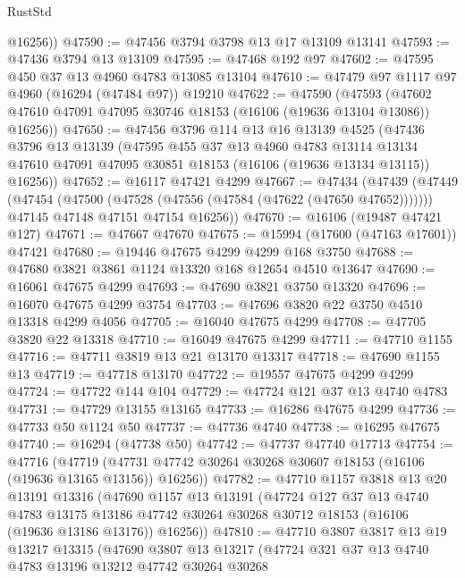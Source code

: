\begin{lexlean}{RustStd}
\begin{coremodule}
        @16256))
@47590 := @47456 @3794 @3798 @13 @17 @13109 @13141
@47593 := @47436 @3794 @13 @13109
@47595 := @47468 @192 @97
@47602 := @47595 @450 @37 @13 @4960 @4783 @13085 @13104
@47610 := @47479 @97 @1117 @97 @4960 (@16294 (@47484 @97)) @19210
@47622 := @47590
    (@47593 (@47602 @47610 @47091 @47095 @30746 @18153 (@16106 (@19636 @13104 @13086)) @16256))
@47650 := @47456
    @3796
    @114
    @13
    @16
    @13139
    @4525
    (@47436
      @3796
      @13
      @13139
      (@47595
        @455
        @37
        @13
        @4960
        @4783
        @13114
        @13134
        @47610
        @47091
        @47095
        @30851
        @18153
        (@16106 (@19636 @13134 @13115))
        @16256))
@47652 := @16117 @47421 @4299
@47667 := @47434
    (@47439
      (@47449
        (@47454 (@47500 (@47528 (@47556 (@47584 (@47622 (@47650 @47652)))))))
        @47145
        @47148
        @47151
        @47154
        @16256))
@47670 := @16106 (@19487 @47421 @127)
@47671 := @47667 @47670
@47675 := @15994 (@17600 (@47163 @17601)) @47421
@47680 := @19446 @47675 @4299 @4299 @168 @3750
@47688 := @47680 @3821 @3861 @1124 @13320 @168 @12654 @4510 @13647
@47690 := @16061 @47675 @4299
@47693 := @47690 @3821 @3750 @13320
@47696 := @16070 @47675 @4299 @3754
@47703 := @47696 @3820 @22 @3750 @4510 @13318 @4299 @4056
@47705 := @16040 @47675 @4299
@47708 := @47705 @3820 @22 @13318
@47710 := @16049 @47675 @4299
@47711 := @47710 @1155
@47716 := @47711 @3819 @13 @21 @13170 @13317
@47718 := @47690 @1155 @13
@47719 := @47718 @13170
@47722 := @19557 @47675 @4299 @4299
@47724 := @47722 @144 @104
@47729 := @47724 @121 @37 @13 @4740 @4783
@47731 := @47729 @13155 @13165
@47733 := @16286 @47675 @4299
@47736 := @47733 @50 @1124 @50
@47737 := @47736 @4740
@47738 := @16295 @47675
@47740 := @16294 (@47738 @50)
@47742 := @47737 @47740 @17713
@47754 := @47716
    (@47719 (@47731 @47742 @30264 @30268 @30607 @18153 (@16106 (@19636 @13165 @13156)) @16256))
@47782 := @47710
    @1157
    @3818
    @13
    @20
    @13191
    @13316
    (@47690
      @1157
      @13
      @13191
      (@47724
        @127
        @37
        @13
        @4740
        @4783
        @13175
        @13186
        @47742
        @30264
        @30268
        @30712
        @18153
        (@16106 (@19636 @13186 @13176))
        @16256))
@47810 := @47710
    @3807
    @3817
    @13
    @19
    @13217
    @13315
    (@47690
      @3807
      @13
      @13217
      (@47724
        @321
        @37
        @13
        @4740
        @4783
        @13196
        @13212
        @47742
        @30264
        @30268

\end{coremodule}
\end{lexlean}
